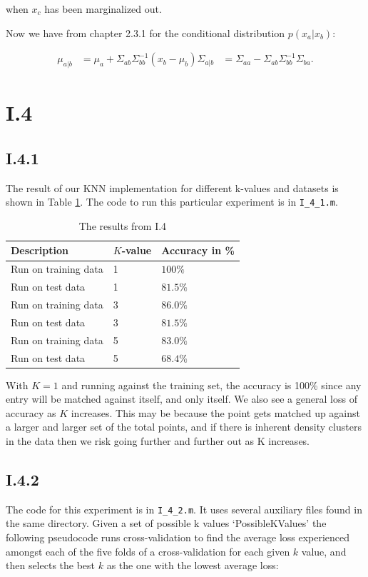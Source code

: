 when $x_c$ has been marginalized out.

Now we have from chapter 2.3.1 for the conditional distribution $p(x_a | x_b)$:

\begin{align*}
	\mu_{a|b} &= \mu_a + \Sigma_{ab} \Sigma_{bb}^{-1}(x_b - \mu_b)
	\Sigma_{a|b} &= \Sigma_{aa} - \Sigma_{ab} \Sigma_{bb}^{-1} \Sigma_{ba}.
\end{align*}

\pagebreak
\section{I.4}
\subsection{I.4.1}
The result of our KNN implementation for different k-values and datasets is
shown in Table \ref{tab:knn-res}. The code to run this particular experiment
is in \texttt{I\_4\_1.m}.
\begin{table}
\center
\begin{tabular}{|l|l|l|}
\hline
Description          & $K$-value & Accuracy in \% \\\hline
Run on training data & 1         & $100  \%$ \\
Run on test data     & 1         & $81.5 \%$ \\
Run on training data & 3         & $86.0 \%$ \\
Run on test data     & 3         & $81.5 \%$ \\
Run on training data & 5         & $83.0 \%$ \\
Run on test data     & 5         & $68.4 \%$ \\\hline
\end{tabular}
\caption{The results from I.4}
\label{tab:knn-res}
\end{table}

With $K=1$ and running against the training set, the accuracy is 100\% since any
entry will be matched against itself, and only itself. We also see a general
loss of accuracy as $K$ increases. This may be because the point gets matched up
against a larger and larger set of the total points, and if there is inherent density
clusters in the data then we risk going further and further out as K increases.

\subsection{I.4.2}
The code for this experiment is in \texttt{I\_4\_2.m}. It uses several auxiliary
files found in the same directory. Given a set of possible k values `PossibleKValues'
the following pseudocode runs cross-validation to find the average loss experienced amongst
each of the five folds of a cross-validation for each given $k$ value, and then selects the
best $k$ as the one with the lowest average loss:

